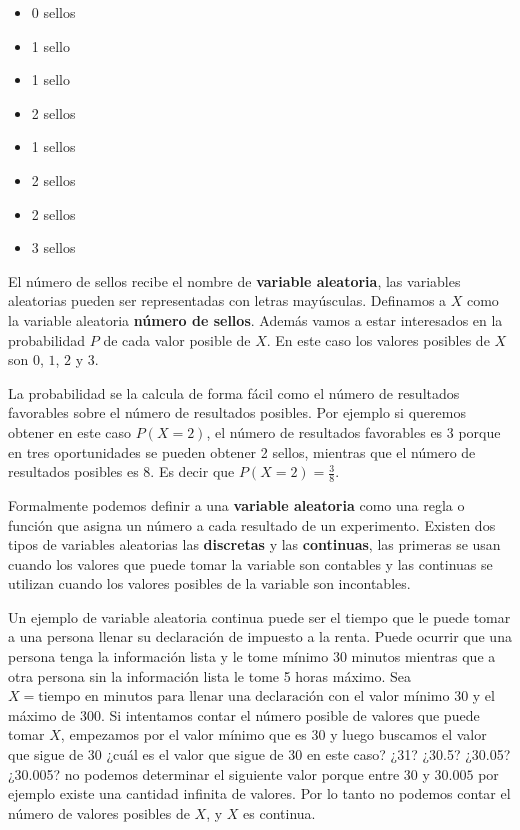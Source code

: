 \documentclass[]{book}
\providecommand{\tightlist}{%
  \setlength{\itemsep}{0pt}\setlength{\parskip}{0pt}}
\begin{document}
\begin{itemize}
\tightlist
\item
  0 sellos
\item
  1 sello
\item
  1 sello
\item
  2 sellos
\item
  1 sellos
\item
  2 sellos
\item
  2 sellos
\item
  3 sellos
\end{itemize}

El número de sellos recibe el nombre de \textbf{variable aleatoria}, las variables aleatorias pueden ser representadas con letras mayúsculas. Definamos a \(X\) como la variable aleatoria \textbf{número de sellos}. Además vamos a estar interesados en la probabilidad \(P\) de cada valor posible de \(X\). En este caso los valores posibles de \(X\) son \(0\), \(1\), \(2\) y \(3\).

La probabilidad se la calcula de forma fácil como el número de resultados favorables sobre el número de resultados posibles. Por ejemplo si queremos obtener en este caso \(P\left(X =2 \right)\), el número de resultados favorables es \(3\) porque en tres oportunidades se pueden obtener 2 sellos, mientras que el número de resultados posibles es 8. Es decir que \(P\left(X=2\right)= \frac{3}{8}\).

Formalmente podemos definir a una \textbf{variable aleatoria} como una regla o función que asigna un número a cada resultado de un experimento. Existen dos tipos de variables aleatorias las \textbf{discretas} y las \textbf{continuas}, las primeras se usan cuando los valores que puede tomar la variable son contables y las continuas se utilizan cuando los valores posibles de la variable son incontables.

Un ejemplo de variable aleatoria continua puede ser el tiempo que le puede tomar a una persona llenar su declaración de impuesto a la renta. Puede ocurrir que una persona tenga la información lista y le tome mínimo 30 minutos mientras que a otra persona sin la información lista le tome 5 horas máximo. Sea \(X= \text{tiempo en minutos para llenar una declaración}\) con el valor mínimo 30 y el máximo de 300. Si intentamos contar el número posible de valores que puede tomar \(X\), empezamos por el valor mínimo que es \(30\) y luego buscamos el valor que sigue de \(30\) ¿cuál es el valor que sigue de 30 en este caso? ¿31? ¿30.5? ¿30.05? ¿30.005? no podemos determinar el siguiente valor porque entre \(30\) y \(30.005\) por ejemplo existe una cantidad infinita de valores. Por lo tanto no podemos contar el número de valores posibles de \(X\), y \(X\) es continua.
\end{document}
